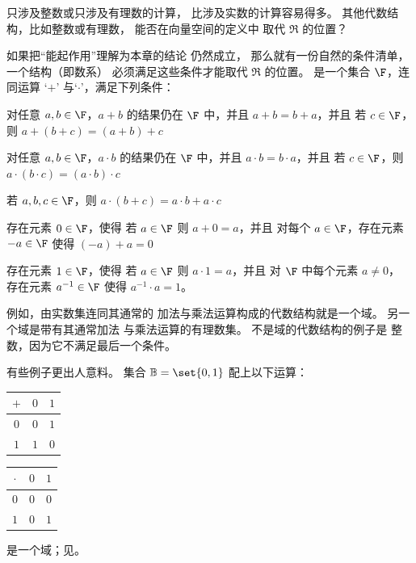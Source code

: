 只涉及整数或只涉及有理数的计算，
比涉及实数的计算容易得多。
其他代数结构，比如整数或有理数，
能否在向量空间的定义中
取代 \( \Re \) 的位置？

如果把“能起作用”理解为本章的结论
仍然成立，
那么就有一份自然的条件清单，
一个结构（即数系）
必须满足这些条件才能取代 $\Re$ 的位置。
 是一个集合
\( \F \)，连同运算
`\( + \)'
与`\( \cdot \)'，满足下列条件：
\begin{tfae}
   \item 对任意 \( a,b\in\F \)，\( a+b \) 的结果仍在 \( \F \) 中，并且
         \( a+b=b+a \)，并且
         若 \( c\in\F \)，则 \( a+(b+c)=(a+b)+c \)
   \item 对任意 \( a,b\in\F \)，\( a\cdot b \) 的结果仍在 \( \F \) 中，并且
         \( a\cdot b=b\cdot a \)，并且
         若 \( c\in\F \)，则 \( a\cdot (b\cdot c)=(a\cdot b)\cdot c \)
   \item 若 \( a,b,c\in\F \)，则 \( a\cdot (b+c)=a\cdot b+a\cdot c \)
   \item 存在元素 \( 0\in\F \)，使得
         若 \( a\in\F \) 则 \( a+0=a \)，并且
         对每个 \( a\in\F \)，存在元素 \( -a\in\F \)
                使得 \( (-a)+a=0 \)
   \item 存在元素 \( 1\in\F \)，使得
         若 \( a\in\F \) 则 \( a\cdot 1=a \)，并且
         对 \( \F \) 中每个元素 \( a\neq 0 \)，
                存在元素 \( a^{-1}\in\F \)
                使得 \( a^{-1}\cdot a=1 \)。
\end{tfae}

例如，由实数集连同其通常的
加法与乘法运算构成的代数结构就是一个域。
另一个域是带有其通常加法
与乘法运算的有理数集。
不是域的代数结构的例子是
整数，因为它不满足最后一个条件。

有些例子更出人意料。
集合 \( \mathbb{B}=\set{0,1} \) 配上以下运算：
\begin{center}
  \begin{tabular}{c|cc}
    \( + \) &\( 0 \) &\( 1 \) \\
    \hline
    \( 0 \) &\( 0 \) &\( 1 \) \\
    \( 1 \) &\( 1 \) &\( 0 \)
  \end{tabular}
  \qquad
  \begin{tabular}{c|cc}
    \( \cdot \) &\( 0 \) &\( 1 \) \\
     \hline
       \( 0 \)  &\( 0 \) &\( 0 \)  \\
       \( 1 \)  &\( 0 \) &\( 1 \)
  \end{tabular}
\end{center}
是一个域；见。

